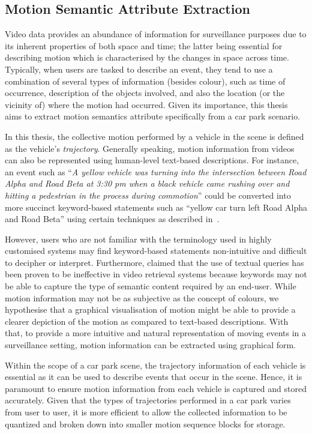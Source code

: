 \vspace{1em}
\subsection{Motion Semantic Attribute Extraction}
\label{section:motionextraction}

Video data provides an abundance of information for surveillance purposes due to its inherent properties of both space and time; the latter being essential for describing motion which is characterised by the changes in space across time.
Typically, when users are tasked to describe an event, they tend to use a combination of several types of information (besides colour), such as time of occurrence, description of the objects involved, and also the location (or the vicinity of) where the motion had occurred.
Given its importance, this thesis aims to extract motion semantics attribute specifically from a car park scenario.

In this thesis, the collective motion performed by a vehicle in the scene is defined as the vehicle's \emph{trajectory}.
Generally speaking, motion information from videos can also be represented using human-level text-based descriptions. For instance, an event such as ``\textit{A yellow vehicle was turning into the intersection between Road Alpha and Road Beta at 3:30 pm when a black vehicle came rushing over and hitting a pedestrian in the process during commotion}'' could be converted into more succinct keyword-based statements such as ``yellow car turn left Road Alpha and Road Beta'' using certain techniques as described in~\cite{feris2012large,momin2015vehicle,yang2015semantic}.

However, users who are not familiar with the terminology used in highly customised systems may find keyword-based statements non-intuitive and difficult to decipher or interpret.
Furthermore,  claimed that the use of textual queries has been proven to be ineffective in video retrieval systems because keywords may not be able to capture the type of semantic content required by an end-user.
While motion information may not be as subjective as the concept of colours, we hypothesise that a graphical visualisation of motion might be able to provide a clearer depiction of the motion as compared to text-based descriptions.
With that, to provide a more intuitive and natural representation of moving events in a surveillance setting, motion information can be extracted using graphical form.

Within the scope of a car park scene, the trajectory information of each vehicle is essential as it can be used to describe events that occur in the scene.
Hence, it is paramount to ensure motion information from each vehicle is captured and stored accurately.
Given that the types of trajectories performed in a car park varies from user to user, %
it is more efficient to allow the collected information to be quantized and broken down into smaller motion sequence blocks for storage.

